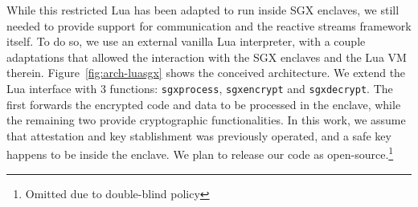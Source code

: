 While this restricted Lua has been adapted to run inside SGX enclaves, we still needed to provide support for communication and the reactive streams framework itself.
To do so, we use an external vanilla Lua interpreter, with a couple adaptations that allowed the interaction with the SGX enclaves and the Lua VM therein.
Figure~\ref{fig:arch-luasgx} shows the conceived architecture.
We extend the Lua interface with 3 functions: \texttt{sgxprocess}, \texttt{sgxencrypt} and \texttt{sgxdecrypt}. 
The first forwards the encrypted code and data to be processed in the enclave, while the remaining two provide cryptographic functionalities.
In this work, we assume that attestation and key stablishment was previously operated, and a safe key happens to be inside the enclave.
We plan to release our code as open-source.\footnote{Omitted due to double-blind policy}
